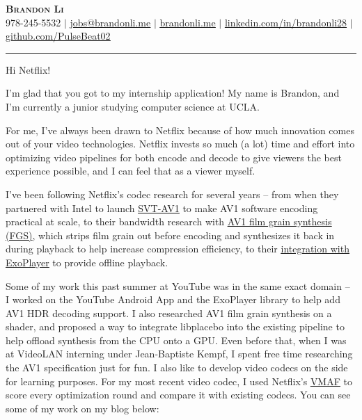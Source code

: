 \documentclass[letterpaper,11pt]{article}
\let\oldhref\href
\renewcommand{\href}[2]{\oldhref{#1}{\uline{#2}}}
\begin{document}
    \begin{center}
        \textbf{\Huge \scshape Brandon Li} \\ \vspace{1pt}
        \small 978-245-5532 $|$
        \href{mailto:jobs@brandonli.me}{jobs@brandonli.me} $|$
        \href{https://brandonli.me}{brandonli.me} $|$
        \href{https://linkedin.com/in/brandonli28}{linkedin.com/in/brandonli28} $|$
        \href{https://github.com/PulseBeat02}{github.com/PulseBeat02}
    \end{center}
    \vspace{-2pt}
    \hrule
    \vspace{6pt}

Hi Netflix!

I'm glad that you got to my internship application! My name is Brandon, and I'm currently a junior studying computer science at UCLA.

For me, I've always been drawn to Netflix because of how much innovation comes out of your video technologies. Netflix invests so much (a lot) time and effort into optimizing video pipelines for both encode and decode to give viewers the best experience possible, and I can feel that as a viewer myself.

I've been following Netflix's codec research for several years -- from when they partnered with Intel to launch \href{https://gitlab.com/AOMediaCodec/SVT-AV1}{SVT-AV1} to make AV1 software encoding practical at scale, to their bandwidth research with \href{https://netflixtechblog.com/av1-scale-film-grain-synthesis-the-awakening-ee09cfdff40b}{AV1 film grain synthesis (FGS)}, which strips film grain out before encoding and synthesizes it back in during playback to help increase compression efficiency, to their \href{https://medium.com/netflix-techblog/netflix-downloads-on-android-d79db40f1732}{integration with ExoPlayer} to provide offline playback.

Some of my work this past summer at YouTube was in the same exact domain -- I worked on the YouTube Android App and the ExoPlayer library to help add AV1 HDR decoding support. I also researched AV1 film grain synthesis on a shader, and proposed a way to integrate libplacebo into the existing pipeline to help offload synthesis from the CPU onto a GPU. Even before that, when I was at VideoLAN interning under Jean-Baptiste Kempf, I spent free time researching the AV1 specification just for fun. I also like to develop video codecs on the side for learning purposes. For my most recent video codec, I used Netflix's \href{https://github.com/Netflix/vmaf}{VMAF} to score every optimization round and compare it with existing codecs. You can see some of my work on my blog below:
\end{document}

